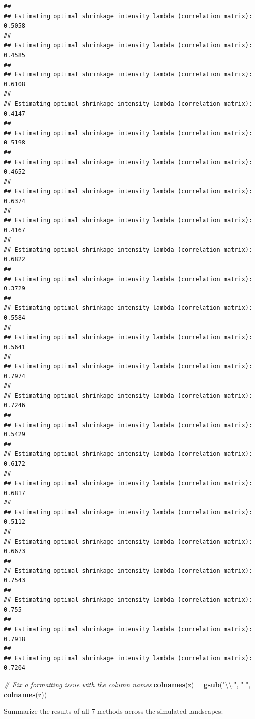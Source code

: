 \documentclass[11pt,]{article}
\newenvironment{Shaded}{\begin{snugshade}}{\end{snugshade}}
\newcommand{\KeywordTok}[1]{\textcolor[rgb]{0.13,0.29,0.53}{\textbf{{#1}}}}
\newcommand{\CharTok}[1]{\textcolor[rgb]{0.31,0.60,0.02}{{#1}}}
\newcommand{\StringTok}[1]{\textcolor[rgb]{0.31,0.60,0.02}{{#1}}}
\newcommand{\CommentTok}[1]{\textcolor[rgb]{0.56,0.35,0.01}{\textit{{#1}}}}
\newcommand{\NormalTok}[1]{{#1}}
\begin{document}
\begin{verbatim}
## 
## Estimating optimal shrinkage intensity lambda (correlation matrix): 0.5058 
## 
## Estimating optimal shrinkage intensity lambda (correlation matrix): 0.4585 
## 
## Estimating optimal shrinkage intensity lambda (correlation matrix): 0.6108 
## 
## Estimating optimal shrinkage intensity lambda (correlation matrix): 0.4147 
## 
## Estimating optimal shrinkage intensity lambda (correlation matrix): 0.5198 
## 
## Estimating optimal shrinkage intensity lambda (correlation matrix): 0.4652 
## 
## Estimating optimal shrinkage intensity lambda (correlation matrix): 0.6374 
## 
## Estimating optimal shrinkage intensity lambda (correlation matrix): 0.4167 
## 
## Estimating optimal shrinkage intensity lambda (correlation matrix): 0.6822 
## 
## Estimating optimal shrinkage intensity lambda (correlation matrix): 0.3729 
## 
## Estimating optimal shrinkage intensity lambda (correlation matrix): 0.5584 
## 
## Estimating optimal shrinkage intensity lambda (correlation matrix): 0.5641 
## 
## Estimating optimal shrinkage intensity lambda (correlation matrix): 0.7974 
## 
## Estimating optimal shrinkage intensity lambda (correlation matrix): 0.7246 
## 
## Estimating optimal shrinkage intensity lambda (correlation matrix): 0.5429 
## 
## Estimating optimal shrinkage intensity lambda (correlation matrix): 0.6172 
## 
## Estimating optimal shrinkage intensity lambda (correlation matrix): 0.6817 
## 
## Estimating optimal shrinkage intensity lambda (correlation matrix): 0.5112 
## 
## Estimating optimal shrinkage intensity lambda (correlation matrix): 0.6673 
## 
## Estimating optimal shrinkage intensity lambda (correlation matrix): 0.7543 
## 
## Estimating optimal shrinkage intensity lambda (correlation matrix): 0.755 
## 
## Estimating optimal shrinkage intensity lambda (correlation matrix): 0.7918 
## 
## Estimating optimal shrinkage intensity lambda (correlation matrix): 0.7204
\end{verbatim}

\begin{Shaded}
\begin{Highlighting}[]
\CommentTok{# Fix a formatting issue with the column names}
\KeywordTok{colnames}\NormalTok{(z) =}\StringTok{ }\KeywordTok{gsub}\NormalTok{(}\StringTok{"}\CharTok{\textbackslash{}\textbackslash{}}\StringTok{."}\NormalTok{, }\StringTok{" "}\NormalTok{, }\KeywordTok{colnames}\NormalTok{(z))}
\end{Highlighting}
\end{Shaded}

Summarize the results of all 7 methods across the simulated landscapes:
\end{document}

